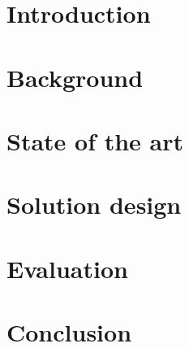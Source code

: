 \documentclass{Configuration_Files/PoliMi3i_thesis}
\begin{document}
\mainmatter %

\chapter{Introduction}

\chapter{Background}

\chapter{State of the art}

\chapter{Solution design}\label{solutionDesign}

\chapter{Evaluation}

\chapter{Conclusion}





\cleardoublepage
{} %
\end{document}
